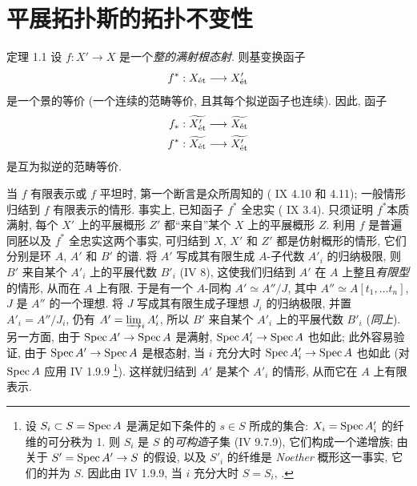 \setcounter{pageoriginal}{366}


\section{平展拓扑斯的拓扑不变性}

\begin{enonce*}{定理 1.1}
设 \pageoriginale $f : X'\to X$ 是一个\emph{整的满射根态射}.
则基变换函子
$$
f^{\ast} : X_{\text{\rm ét}} \to X'_{\text{\rm ét}}
$$
是一个景的等价 (\ie 一个连续的范畴等价, 且其每个拟逆函子也连续).
因此, 函子
\begin{align*}
f_{\ast} : \widetilde{X'_{\text{\rm ét}}} &\to \widetilde{X_{\text{\rm ét}}}\\
f^{\ast} : \widetilde{X_{\text{\rm ét}}} &\to \widetilde{X'_{\text{\rm
      ét}}}
\end{align*}
是互为拟逆的范畴等价.
\end{enonce*}

当 $f$ 有限表示或 $f$ 平坦时, 第一个断言是众所周知的
(\SGA{} IX 4.10 和 4.11);
一般情形归结到 $f$ 有限表示的情形. 事实上, 已知函子 $f^{\ast}$ 全忠实
( IX 3.4). 只须证明 $f^{\ast}$\pageoriginale 本质满射,
\ie 每个 $X'$ 上的平展概形 $Z'$ 都“来自”某个 $X$ 上的平展概形 $Z$.
利用 $f$ 是普遍同胚以及 $f^{\ast}$ 全忠实这两个事实,
可归结到 $X$, $X'$ 和 $Z'$ 都是仿射概形的情形,
它们分别是环 $A$, $A'$ 和 $B'$ 的谱.
将 $A'$ 写成其有限生成 $A$-子代数 $A'_{i}$ 的归纳极限,
则 $B'$ 来自某个 $A'_{i}$ 上的平展代数 $B'_{i}$
(\cf \EGA IV 8), 这使我们归结到 $A'$ 在 $A$ 上整且\emph{有限型}的情形,
从而在 $A$ 上有限.
于是有一个 $A$-同构 $A'\simeq A''/J$,
其中 $A'' \simeq A [t_1, \ldots t_n]$, $J$ 是 $A''$ 的一个理想.
将 $J$ 写成其有限生成子理想 $J_i$ 的归纳极限, 并置 $A'_i = A'' /J_i$,
仍有 $A' = \varinjlim_i A'_{i}$,
所以 $B'$ 来自某个 $A'_i$ 上的平展代数 $B'_i$ (\emph{同上}).
另一方面, 由于 $\Spec A'\to \Spec A$ 是满射,
$\Spec A'_i \to \Spec A$ 也如此;
此外容易验证, 由于 $\Spec A'\to \Spec A$ 是根态射,
当 $i$ 充分大时 $\Spec A'_i \to \Spec A$ 也如此
(对 $\operatorname{Spec} A$ 应用 \EGA IV 1.9.9
\footnote{设 $S_i \subset S = \operatorname{Spec} A$ 是满足如下条件的 $s \in S$ 所成的集合:
$X_i = \operatorname{Spec} A'_i$ 的纤维的可分秩为 1.
则 $S_i$ 是 $S$ 的\emph{可构造}子集 (\EGA IV 9.7.9),
它们构成一个递增族;
由关于 $S'=\Spec A'\to S$ 的假设,
以及 $S'_i$ 的纤维是 \emph{Noether} 概形这一事实, 它们的并为 $S$.
因此由 \EGA IV 1.9.9, 当 $i$ 充分大时 $S=S_i$, \cqfd.}).
这样就归结到 $A'$ 是某个 $A'_i$ 的情形, 从而它在 $A$ 上有限表示.

